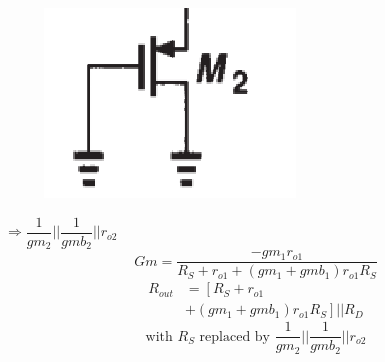 \documentclass{beamer}
\begin{document}
\begin{frame}
\begin{minipage}{0.45\linewidth}
    \end{minipage}
    \begin{minipage}{0.5\linewidth}
        \begin{minipage}{0.4\linewidth}
            \begin{figure}[H]
                \includegraphics[width=0.9\linewidth]{Rs}
            \end{figure}
        \end{minipage}
        $\Rightarrow \dfrac{1}{gm_2}||\dfrac{1}{gmb_2}||r_{o2}$\\
        \begin{equation*}
            Gm = \frac{-gm_{1} r_{o1}}{R_S+r_{o1}+\left(gm_{1}+gmb_{1}\right) r_{o1} R_{S}} 
        \end{equation*}
        \begin{equation*}
            \begin{aligned}
                R_{out} &= \left[R_S+r_{o1}\right.\\
                &\left.+\left(gm_{1}+gmb_{1}\right) r_{o 1}R_{S}\right] || R_{D}
            \end{aligned}
        \end{equation*}
        \begin{equation*}
            \text{with } R_S \text{ replaced by } \dfrac{1}{gm_2}||\dfrac{1}{gmb_2}||r_{o2}
        \end{equation*}
    \end{minipage}
\end{frame}
\end{document}
